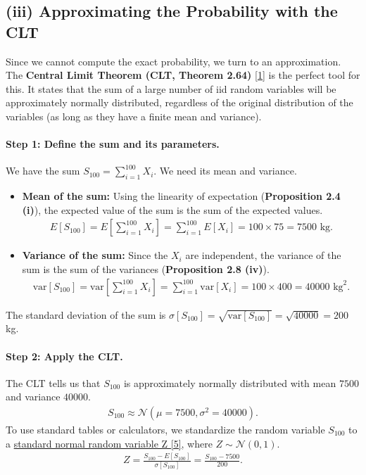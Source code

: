 \documentclass[11pt,a4paper]{article}
\begin{document}
\subsection*{(iii) Approximating the Probability with the CLT}
Since we cannot compute the exact probability, we turn to an approximation. The \textbf{Central Limit Theorem (CLT, Theorem 2.64)} \hyperlink{concept:clt}{[1]} is the perfect tool for this. It states that the sum of a large number of iid random variables will be approximately normally distributed, regardless of the original distribution of the variables (as long as they have a finite mean and variance).

\paragraph{Step 1: Define the sum and its parameters.}
We have the sum $S_{100} = \sum_{i=1}^{100} X_i$. We need its mean and variance.
\begin{itemize}
    \item \textbf{Mean of the sum:} Using the linearity of expectation (\textbf{Proposition 2.4 (i)}), the expected value of the sum is the sum of the expected values.
    \begin{align*}
        E[S_{100}] = E\left[\sum_{i=1}^{100} X_i\right] = \sum_{i=1}^{100} E[X_i] = 100 \times 75 = 7500 \text{ kg}.
    \end{align*}
    \item \textbf{Variance of the sum:} Since the $X_i$ are independent, the variance of the sum is the sum of the variances (\textbf{Proposition 2.8 (iv)}).
    \begin{align*}
        \text{var}[S_{100}] = \text{var}\left[\sum_{i=1}^{100} X_i\right] = \sum_{i=1}^{100} \text{var}[X_i] = 100 \times 400 = 40000 \text{ kg}^2.
    \end{align*}
\end{itemize}
The standard deviation of the sum is $\sigma[S_{100}] = \sqrt{\text{var}[S_{100}]} = \sqrt{40000} = 200$ kg.

\paragraph{Step 2: Apply the CLT.}
The CLT tells us that $S_{100}$ is approximately normally distributed with mean $7500$ and variance $40000$.
\begin{align*}
    S_{100} \approx \mathcal{N}(\mu=7500, \sigma^2=40000).
\end{align*}
To use standard tables or calculators, we standardize the random variable $S_{100}$ to a \hyperlink{concept:stdnormal}{standard normal random variable Z [5]}, where $Z \sim \mathcal{N}(0, 1)$.
\begin{align*}
    Z = \frac{S_{100} - E[S_{100}]}{\sigma[S_{100}]} = \frac{S_{100} - 7500}{200}.
\end{align*}
\end{document}
